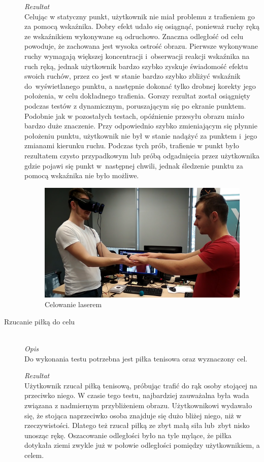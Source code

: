\documentclass[a4paper,11pt,twoside]{report}
\theoremstyle{definition}
\begin{document}
\begin{description}
\textit{Rezultat} \\
Celując w statyczny punkt, użytkownik nie miał problemu z trafieniem go za pomocą wskaźnika. Dobry efekt udało się osiągnąć, ponieważ ruchy ręką ze wskaźnikiem wykonywane są odruchowo. Znaczna odległość od celu powoduje, że zachowana jest wysoka ostrość obrazu. Pierwsze wykonywane ruchy wymagają większej koncentracji i~obserwacji reakcji wskaźnika na ruch ręką, jednak użytkownik bardzo szybko zyskuje świadomość efektu swoich ruchów, przez co jest w stanie bardzo szybko zbliżyć wskaźnik do~wyświetlanego punktu, a następnie dokonać tylko drobnej korekty jego położenia, w celu dokładnego trafienia. Gorszy rezultat został osiągnięty podczas testów z dynamicznym, poruszającym się po ekranie punktem. Podobnie jak w pozostałych testach, opóźnienie przesyłu obrazu miało bardzo duże znaczenie. Przy odpowiednio szybko zmieniającym się płynnie położeniu punktu, użytkownik nie był w stanie nadążyć za punktem i~jego zmianami kierunku ruchu. Podczas tych prób, trafienie w punkt było rezultatem czysto przypadkowym lub próbą odgadnięcia przez użytkownika gdzie pojawi się punkt w~następnej chwili, jednak śledzenie punktu za pomocą wskaźnika nie było możliwe.

\begin{figure}[H]
\centering
\includegraphics[scale=0.25]{images/lapkiTest}
\caption[AimingTest]{Celowanie laserem}
\end{figure}

\item[Rzucanie piłką do celu] \hfill \\
\textit{Opis} \\
Do wykonania testu potrzebna jest piłka tenisowa oraz wyznaczony cel. 

\textit{Rezultat} \\
Użytkownik rzucał piłką tenisową, próbując trafić do rąk osoby stojącej na przeciwko niego. W czasie tego testu, najbardziej zauważalna była wada związana z nadmiernym przybliżeniem obrazu. Użytkownikowi wydawało się, że stojąca naprzeciwko osoba znajduje się dużo bliżej niego, niż w rzeczywistości. Dlatego też rzucał piłką ze zbyt małą siła lub~zbyt nisko unosząc rękę. Oszacowanie odległości było na tyle mylące, że piłka dotykała ziemi zwykle już w połowie odległości pomiędzy użytkownikiem, a celem.


\end{description}
\end{document}
